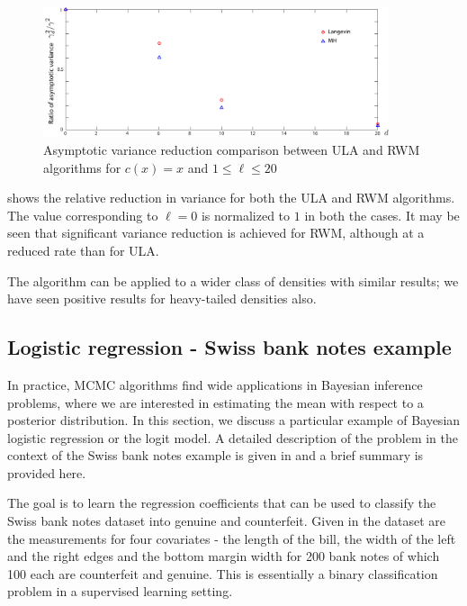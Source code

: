 \begin{figure}[htbp]
	\centering
		\includegraphics[width=4in]{images/Chap5_rel_red_lang_mh_all}
\caption{Asymptotic variance reduction comparison between ULA and RWM algorithms for $c(x) =x$ and $1\leq \ell \leq 20$}
\label{fig:mcmc_ula_rwm_asy_var}
\end{figure}
 shows the relative reduction in variance for both the ULA and RWM algorithms. The value corresponding to $\ell = 0$ is normalized to $1$ in both the cases. It may be seen that significant variance reduction is achieved for RWM, although at a reduced rate than for ULA.

The algorithm can be applied to a wider class of densities with similar results; we have seen positive results for heavy-tailed densities also. %

\subsection{Logistic regression - Swiss bank notes example}
In practice, MCMC algorithms find wide applications in Bayesian inference problems, where we are interested in estimating the mean with respect to a posterior distribution. In this section, we discuss a particular example of Bayesian logistic regression or the logit model. A detailed description of the problem in the context of the Swiss bank notes example is given in \cite{papmirgir14} and a brief summary is provided here.

The goal is to learn the regression coefficients that can be used to classify the Swiss bank notes dataset into genuine and counterfeit. Given in the dataset are the measurements for four covariates - the length of the bill, the width of the left and the right edges and the bottom margin width for 200 bank notes of which 100 each are counterfeit and genuine. This is essentially a binary classification problem in a supervised learning setting. 

